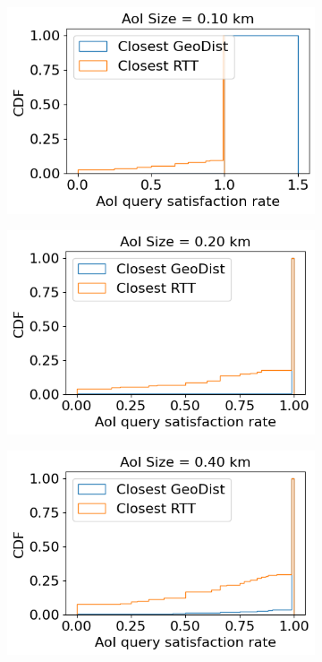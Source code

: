 \begin{figure}
\centering
\begin{subfigure}{0.3\textwidth}
  \centering
  \includegraphics[width=\linewidth]{figures/mechanisms/spatial_ctx_mgmt/aoi_satisfaction_rate_cdf_AOI_0.100_km.png}
  \caption{}
\end{subfigure}%
\begin{subfigure}{0.3\textwidth}
  \centering
  \includegraphics[width=\linewidth]{figures/mechanisms/spatial_ctx_mgmt/aoi_satisfaction_rate_cdf_AOI_0.200_km.png}
  \caption{}
\end{subfigure}
\begin{subfigure}{0.3\textwidth}
  \centering
  \includegraphics[width=\linewidth]{figures/mechanisms/spatial_ctx_mgmt/aoi_satisfaction_rate_cdf_AOI_0.400_km.png}

\end{subfigure}
\end{figure}
